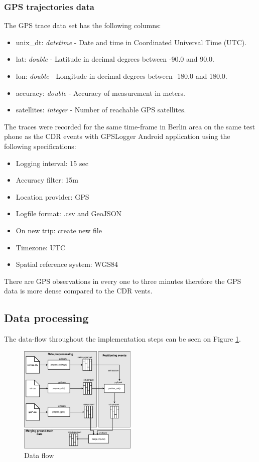 \subsubsection{GPS trajectories data}
The GPS trace data set has the following columns:
\begin{itemize}
\item unix\_dt: \textit{datetime} - Date and time in Coordinated Universal Time (UTC).
\item lat: \textit{double} - Latitude in decimal degrees between -90.0 and 90.0.
\item lon: \textit{double} - Longitude in decimal degrees between -180.0 and 180.0.
\item accuracy: \textit{double} - Accuracy of measurement in meters.
\item satellites: \textit{integer} -  Number of reachable GPS satellites.
\end{itemize}

The traces were recorded for the same time-frame in Berlin area on the same test phone as the CDR events with GPSLogger Android application using the following specifications:
\begin{itemize}
\item Logging interval: 15 sec
\item Accuracy filter: 15m
\item Location provider: GPS
\item Logfile format: .csv and GeoJSON
\item On new trip: create new file
\item Timezone: UTC
\item Spatial reference system: WGS84
\end{itemize}

There are GPS observations in every one to three minutes therefore the GPS data is more dense compared to the CDR vents. 

\subsection{Data processing}\label{sec:data-proc}
The data-flow throughout the implementation steps can be seen on Figure \ref{fig:data-flow}.
\begin{figure}[h]
    \centering
    \includegraphics[width=0.5\textwidth]{images/data-flow.png}
    \caption{Data flow}
    \label{fig:data-flow}
\end{figure}

